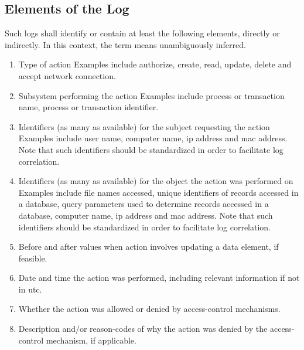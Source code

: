 \subsection{Elements of the Log}
Such logs shall identify or contain at least the following elements, directly or indirectly.  
In this context, the term  means unambiguously inferred.
\begin{enumerate}
\item
Type of action\newline{}
Examples include authorize, create, read, update, delete\oxford{} and accept network connection.
\item
Subsystem performing the action\newline{}
Examples include process or transaction name, process\oxford{} or transaction identifier.
\item
Identifiers (as many as available) for the subject requesting the action\newline{}
Examples include user name, computer name, \gls{ip} address\oxford{} and \gls{mac} address.  
Note that such identifiers should be standardized in order to facilitate log correlation.
\item
Identifiers (as many as available) for the object the action was performed on\newline{}
Examples include file names accessed, unique identifiers of records accessed in a database, query parameters used to determine records accessed in a database, computer name, \gls{ip} address\oxford{} and \gls{mac} address.  
Note that such identifiers should be standardized in order to facilitate log correlation.
\item
Before and after values when action involves updating a data element, if feasible.
\item
Date and time the action was performed, including relevant \timezone{} information if not in \gls{utc}.
\item
Whether the action was allowed or denied by access-control mechanisms.
\item
Description and/or reason-codes of why the action was denied by the access-control mechanism, if applicable.
\end{enumerate}
